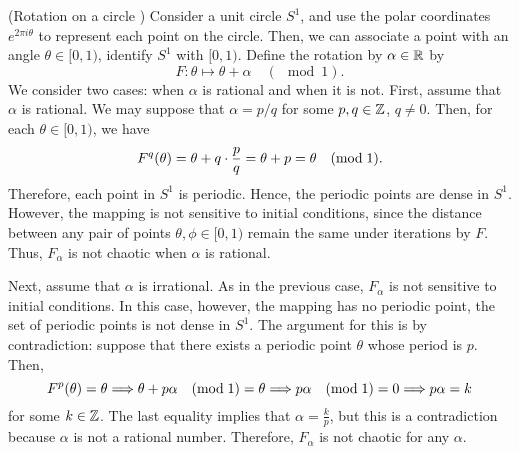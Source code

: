 \documentclass[10pt,draft,twoside]{book}
\begin{document}
\begin{example}
  (Rotation on a circle \citep{devaney})
  Consider a unit circle $S^1$, and use the polar coordinates $e^{2\pi i \theta}$ to represent each point on the circle.
  Then, we can associate a point with an angle $\theta \in [0, 1)$, identify $S^1$ with $[0,1)$. %
  Define the rotation by $\alpha \in \mathbb{R}$ by
  \begin{equation*}
    F: \theta \mapsto \theta + \alpha \quad(\mod{1}).
  \end{equation*}
  We consider two cases: when $\alpha$ is rational and when it is not.
  First, assume that $\alpha$ is rational.
  We may suppose that $\alpha = p/q$ for some $p, q \in \mathbb{Z}$, $q \neq 0$.
  Then, for each $\theta \in [0, 1)$, we have %
  \begin{equation*}
    F^{q}(\theta) = \theta + q \cdot \frac{p}{q} = \theta + p = \theta \quad(\mathrm{mod}\; \mathrm{1}).
  \end{equation*}
Therefore, each point in $S^1$ is periodic. %
  Hence, the periodic points are dense in $S^1$. %
  However, the mapping is not sensitive to initial conditions, since the distance between any pair of points $\theta, \phi \in [0,1)$ remain the same under iterations by $F$.  %
  Thus, $F_\alpha$ is not chaotic when $\alpha$ is rational.

  Next, assume that $\alpha$ is irrational.
  As in the previous case, $F_\alpha$ is not sensitive to initial conditions.
In this case, however, the mapping has no periodic point, the set of periodic points is not dense in $S^1$. %
The argument for this is by contradiction: suppose that there exists a periodic point $\theta$ whose period is $p$.
Then,
\begin{equation*}
  F^{p}(\theta) = \theta 
  \Longrightarrow
  \theta + p\alpha \quad(\mathrm{mod}\; \mathrm{1}) = \theta
  \Longrightarrow
  p\alpha \quad(\mathrm{mod}\; \mathrm{1}) = 0
  \Longrightarrow
  p\alpha = k
\end{equation*}
for some $k \in \mathbb{Z}$.
The last equality implies that $\alpha = \frac{k}{p}$, but this is a contradiction because $\alpha$ is not a rational number.
Therefore, $F_\alpha$ is not chaotic for any $\alpha$.


\end{example}
\end{document}
